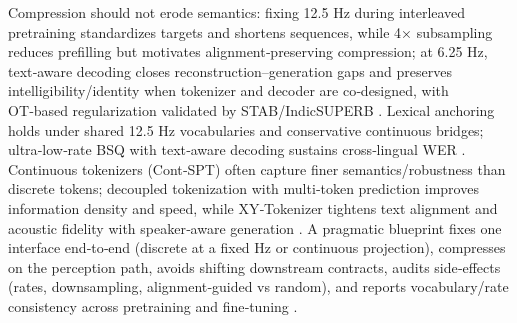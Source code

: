 \documentclass{article}
\begin{document}
Compression should not erode semantics: fixing 12.5 Hz during interleaved pretraining standardizes targets and shortens sequences, while 4× subsampling reduces prefilling but motivates alignment‑preserving compression; at 6.25 Hz, text‑aware decoding closes reconstruction–generation gaps and preserves intelligibility/identity when tokenizer and decoder are co‑designed, with OT‑based regularization validated by STAB/IndicSUPERB \cite{zeng2024scalingspeechtextpretrainingsyntheticint,wang2023slmbridgethingapbetweenspeechtextfoundat,wang2025tadicodectextawarediffusionspeechtokeniz,xu2025optimaltransportregularizationspeechtext,vashishth2024stabspeechtokenizerassessmentbenchmark,entry2025indicsuperbspeechprocessinguniversalperf}. Lexical anchoring holds under shared 12.5 Hz vocabularies and conservative continuous bridges; ultra‑low‑rate BSQ with text‑aware decoding sustains cross‑lingual WER \cite{zeng2024scalingspeechtextpretrainingsyntheticint,wang2023slmbridgethingapbetweenspeechtextfoundat,wang2025tadicodectextawarediffusionspeechtokeniz}. Continuous tokenizers (Cont‑SPT) often capture finer semantics/robustness than discrete tokens; decoupled tokenization with multi‑token prediction improves information density and speed, while XY‑Tokenizer tightens text alignment and acoustic fidelity with speaker‑aware generation \cite{li2025continuousspeechtokenizertext,gong2025xytokenizermitigatingsemanticacousticcon,fan2025whatmakesgoodspeechtokenizerllmcentricge,wang2024comparativestudydiscretespeechtokenssema}. A pragmatic blueprint fixes one interface end‑to‑end (discrete at a fixed Hz or continuous projection), compresses on the perception path, avoids shifting downstream contracts, audits side‑effects (rates, downsampling, alignment‑guided vs random), and reports vocabulary/rate consistency across pretraining and fine‑tuning \cite{turetzky2024lastlanguagemodelawarespeechtokenization,li2025continuousspeechtokenizertext,verma2024whispergpthybridrepresentationaudiolarge,wang2024c3llmconditionalmultimodalcontentgenerat}.
\end{document}
